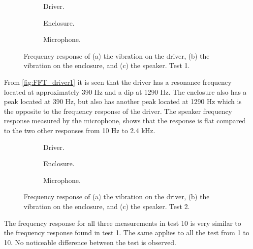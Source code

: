 \begin{figure}[H]
\centering
\begin{subfigure}[t]{0.37\textwidth}
	
	\caption{Driver.}
	\label{fig:FFT_driver1}
\end{subfigure}
\begin{subfigure}[t]{0.28\textwidth}
	
	\caption{Enclosure.}
	\label{fig:FFT_enclosure1}
\end{subfigure}
\begin{subfigure}[t]{0.32\textwidth}
	
	\caption{Microphone.}
	\label{fig:FFT_mic1}
\end{subfigure}
\caption{Frequency response of (a) the vibration on the driver, (b) the vibration on the enclosure, and (c) the speaker. Test 1.}
\label{fig:FFT1}
\end{figure}

From \autoref{fig:FFT_driver1} it is seen that the driver has a resonance frequency located at approximately 390 Hz and a dip at 1290 Hz. The enclosure also has a peak located at 390 Hz, but also has another peak located at 1290 Hz which is the opposite to the frequency response of the driver. The speaker frequency response measured by the microphone, shows that the response is flat compared to the two other responses from 10 Hz to 2.4 kHz.

\begin{figure}[H]
\centering
\begin{subfigure}[t]{0.37\textwidth}
	
	\caption{Driver.}
	\label{fig:FFT_driver10}
\end{subfigure}
\begin{subfigure}[t]{0.28\textwidth}
	
	\caption{Enclosure.}
	\label{fig:FFT_enclosure10}
\end{subfigure}
\begin{subfigure}[t]{0.32\textwidth}
	
	\caption{Microphone.}
	\label{fig:FFT_mic10}
\end{subfigure}
\caption{Frequency response of (a) the vibration on the driver, (b) the vibration on the enclosure, and (c) the speaker. Test 2.}
\label{fig:FFT1}
\end{figure}

The frequency response for all three measurements in test 10 is very similar to the frequency response found in test 1. The same applies to all the test from 1 to 10. No noticeable difference between the test is observed.

